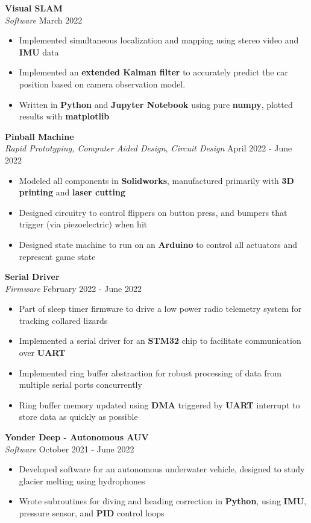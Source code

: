 \documentclass[a4paper]{article}
\newenvironment{entry}[4][]{
  \textbf{#2} \hfill #1 \\
  \textit{#3} \hfill #4 \\
  \vspace{-2mm}
  \begin{itemize} \itemsep 0em
  }
  {
  \end{itemize}
}
\begin{document}
\vspace{1mm}
\begin{entry}{Visual SLAM}{Software}{March 2022}
\item Implemented simultaneous localization and mapping using stereo video and \textbf{IMU} data
\item Implemented an \textbf{extended Kalman filter} to accurately predict the car position based on camera observation model.
\item Written in \textbf{Python} and \textbf{Jupyter Notebook} using pure \textbf{numpy}, plotted results with \textbf{matplotlib}
\end{entry}

\begin{entry}{Pinball Machine}{Rapid Prototyping, Computer Aided Design, Circuit
    Design}{April 2022 - June 2022}
\item Modeled all components in \textbf{Solidworks}, manufactured primarily with \textbf{3D printing} and \textbf{laser cutting}
\item Designed circuitry to control flippers on button press, and bumpers that
  trigger (via piezoelectric) when hit
\item Designed state machine to run on an \textbf{Arduino} to control all actuators and represent game state
\end{entry}

\begin{entry}{Serial Driver}{Firmware}{February 2022 - June 2022}
\item Part of sleep timer firmware to drive a low power radio telemetry system
  for tracking collared lizards
\item Implemented a serial driver for an \textbf{STM32} chip to facilitate
  communication over \textbf{UART}
\item Implemented ring buffer abstraction for robust processing of data from multiple serial ports concurrently
\item Ring buffer memory updated using \textbf{DMA} triggered by \textbf{UART}
  interrupt to store data as quickly as possible
\end{entry}

\begin{entry}{Yonder Deep - Autonomous AUV}{Software}{October 2021 - June 2022}
\item Developed software for an autonomous underwater vehicle, designed to study glacier melting using hydrophones
\item Wrote subroutines for diving and heading correction in \textbf{Python}, using \textbf{IMU}, pressure sensor, and \textbf{PID} control loops
\end{entry}
\end{document}

